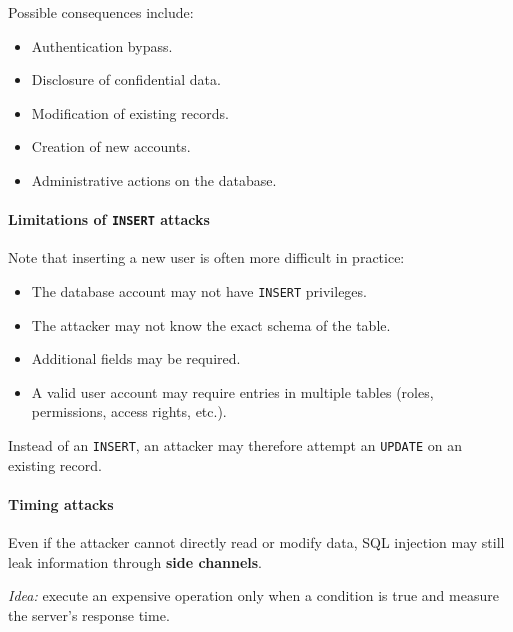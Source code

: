 \vspace{0.3em}

Possible consequences include:

\begin{itemize}
    \item Authentication bypass.
    \item Disclosure of confidential data.
    \item Modification of existing records.
    \item Creation of new accounts.
    \item Administrative actions on the database.
\end{itemize}

\paragraph{Limitations of \texttt{INSERT} attacks}

Note that inserting a new user is often more difficult in practice:

\begin{itemize}
    \item The database account may not have \texttt{INSERT} privileges.
    \item The attacker may not know the exact schema of the table.
    \item Additional fields may be required.
    \item A valid user account may require entries in multiple tables (roles, permissions, access rights, etc.).
\end{itemize}

\vspace{0.3em}

Instead of an \texttt{INSERT}, an attacker may therefore attempt an \texttt{UPDATE} on an existing record.

\paragraph{Timing attacks}

Even if the attacker cannot directly read or modify data, SQL injection may still leak information through \textbf{side channels}.

\vspace{0.3em}

\textit{Idea:} execute an expensive operation only when a condition is true and measure the server's response time.


\vspace{0.3em}

